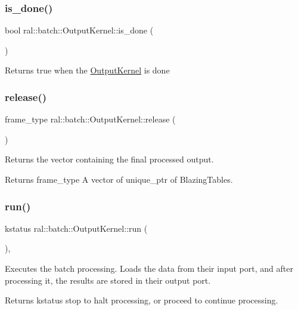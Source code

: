 \subsubsection{\texorpdfstring{is\+\_\+done()}{is\_done()}}
{\footnotesize\ttfamily bool ral\+::batch\+::\+Output\+Kernel\+::is\+\_\+done (\begin{DoxyParamCaption}{ }\end{DoxyParamCaption})}

Returns true when the \hyperlink{classral_1_1batch_1_1OutputKernel}{Output\+Kernel} is done \mbox{\label{classral_1_1batch_1_1OutputKernel_adc3b6153007602790ee9045740fce823}} 
\subsubsection{\texorpdfstring{release()}{release()}}
{\footnotesize\ttfamily frame\+\_\+type ral\+::batch\+::\+Output\+Kernel\+::release (\begin{DoxyParamCaption}{ }\end{DoxyParamCaption})}

Returns the vector containing the final processed output. \begin{DoxyReturn}{Returns}
frame\+\_\+type A vector of unique\+\_\+ptr of Blazing\+Tables. 
\end{DoxyReturn}
\mbox{\label{classral_1_1batch_1_1OutputKernel_a53519f315635c5e83e958fda42300f9a}} 
\subsubsection{\texorpdfstring{run()}{run()}}
{\footnotesize\ttfamily kstatus ral\+::batch\+::\+Output\+Kernel\+::run (\begin{DoxyParamCaption}{ }\end{DoxyParamCaption})\hspace{0.3cm}{\ttfamily [override]}, {\ttfamily [virtual]}}

Executes the batch processing. Loads the data from their input port, and after processing it, the results are stored in their output port. \begin{DoxyReturn}{Returns}
kstatus \textquotesingle{}stop\textquotesingle{} to halt processing, or \textquotesingle{}proceed\textquotesingle{} to continue processing. 
\end{DoxyReturn}


